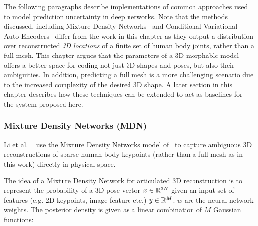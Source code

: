 The following paragraphs describe implementations of common approaches used to model prediction uncertainty in deep networks. Note that the methods discussed, including Mixture Density Networks~\cite{bishop94mixture,li19generating} and Conditional Variational Auto-Encoders~\cite{sharma19monocular} differ from the work in this chapter as they output a distribution over reconstructed \emph{3D locations} of a finite set of human body joints, rather than a full mesh. This chapter argues that the parameters of a 3D morphable model offers a better space for coding not just 3D shapes and poses, but also their ambiguities. In addition, predicting a full mesh is a more challenging scenario due to the increased complexity of the desired 3D shape. A later section in this chapter describes how these techniques can be extended to act as baselines for the system proposed here. 




\subsubsection{Mixture Density Networks (MDN)}

Li et al. ~\cite{li19generating} use the Mixture Density Networks model of~\cite{bishop94mixture} to capture ambiguous 3D reconstructions of sparse human body keypoints (rather than a full mesh as in this work) directly in physical space. 

The idea of a Mixture Density Network for articulated 3D reconstruction is to represent the probability of a 3D pose vector $x \in {\mathbb{R}^{3N}}$ given an input set of features (e.g. 2D keypoints, image feature etc.) $y \in {\mathbb{R}^{M}}$. $w$ are the neural network weights. The posterior density is given as a linear combination of $M$ Gaussian functions:

